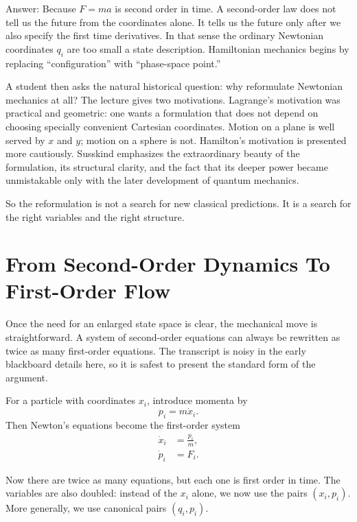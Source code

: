 Answer: Because \(F=ma\) is second order in time. A second-order law does not tell us the future from the coordinates alone. It tells us the future only after we also specify the first time derivatives. In that sense the ordinary Newtonian coordinates \(q_i\) are too small a state description. Hamiltonian mechanics begins by replacing ``configuration'' with ``phase-space point.''

A student then asks the natural historical question: why reformulate Newtonian mechanics at all? The lecture gives two motivations. Lagrange's motivation was practical and geometric: one wants a formulation that does not depend on choosing specially convenient Cartesian coordinates. Motion on a plane is well served by \(x\) and \(y\); motion on a sphere is not. Hamilton's motivation is presented more cautiously. Susskind emphasizes the extraordinary beauty of the formulation, its structural clarity, and the fact that its deeper power became unmistakable only with the later development of quantum mechanics.

So the reformulation is not a search for new classical predictions. It is a search for the right variables and the right structure.

\section{From Second-Order Dynamics To First-Order Flow}

Once the need for an enlarged state space is clear, the mechanical move is straightforward. A system of second-order equations can always be rewritten as twice as many first-order equations. The transcript is noisy in the early blackboard details here, so it is safest to present the standard form of the argument.

For a particle with coordinates \(x_i\), introduce momenta by
\begin{equation}
p_i = m \dot x_i .
\end{equation}
Then Newton's equations become the first-order system
\begin{align}
\dot x_i &= \frac{p_i}{m}, \\
\dot p_i &= F_i .
\end{align}

Now there are twice as many equations, but each one is first order in time. The variables are also doubled: instead of the \(x_i\) alone, we now use the pairs \((x_i,p_i)\). More generally, we use canonical pairs \((q_i,p_i)\).

